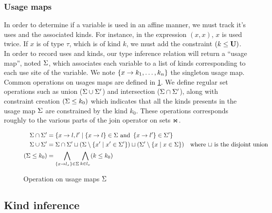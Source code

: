 


\subsubsection{Usage maps}

In order to determine if a variable is used in an affine manner, we must track
it's uses and the associated kinds. For instance, in the expression
$(x,x)$, $x$ is used twice. If $x$ is of type $\tau$, which is of kind $k$,
we must add the constraint $(k \leq \mathbf{U})$. In order to record uses and kinds,
our type inference relation will return a ``usage map'', noted $\Sigma$,
which associates each variable to a list of kinds corresponding to each use site
of the variable.
We note $\left\{x \to k_1,\dots,k_n\right\}$ the singleton usage map.
Common operations on usages maps are defined in \cref{op:usgmap}. We define
regular set operations such as union
($\Sigma\cup\Sigma'$) and intersection ($\Sigma\cap\Sigma'$), along
with constraint creation $(\Sigma \leq k_0)$ which indicates that all the kinds
presents in the usage map $\Sigma$ are constrained by the kind $k_0$.
These operations corresponds roughly to the various parts of the join
operator on sets $\operatorname{\Join}$.

\begin{figure}[h]\centering
\begin{align*}
  \Sigma\cap\Sigma'
  &= \left\{ x \to l,l'
    \mid \left\{x \to l\right\}\in\Sigma \text{ and } \left\{x \to l'\right\}\in\Sigma' \right\} \\
  \Sigma\cup\Sigma'
  &= \Sigma\cap\Sigma' \sqcup
    (\Sigma\setminus \{x' \mid x'\in\Sigma'\}) \sqcup
    (\Sigma'\setminus \{x \mid x\in\Sigma\})
  &\text{where $\sqcup$ is the disjoint union}\\
  (\Sigma \leq k_0)
  &= \bigwedge_{\left\{x \to l_x\right\}\in\Sigma} \bigwedge_{k\in l_x} (k \leq k_0)
\end{align*}
\caption{Operation on usage maps $\Sigma$}
\label{op:usgmap}
\end{figure}

\subsection{Kind inference}

